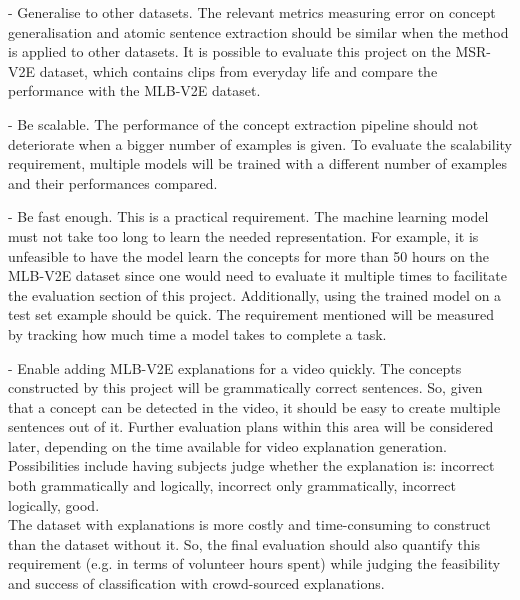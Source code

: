  - Generalise to other datasets. The relevant metrics measuring error on concept generalisation and atomic sentence extraction should be similar when the method is applied to other datasets. It is possible to evaluate this project on the MSR-V2E \cite{RefWorks:RefID:16-2021automatic} dataset, which contains clips from everyday life and compare the performance with the MLB-V2E \cite{RefWorks:RefID:16-2021automatic} dataset.
 
 - Be scalable. The performance of the concept extraction pipeline should not deteriorate when a bigger number of examples is given. To evaluate the scalability requirement, multiple models will be trained with a different number of examples and their performances compared.
 
 - Be fast enough. This is a practical requirement. The machine learning model must not take too long to learn the needed representation. For example, it is unfeasible to have the model learn the concepts for more than 50 hours on the MLB-V2E dataset since one would need to evaluate it multiple times to facilitate the evaluation section of this project. Additionally, using the trained model on a test set example should be quick. The requirement mentioned will be measured by tracking how much time a model takes to complete a task.
 
 - Enable adding MLB-V2E explanations for a video quickly. The concepts constructed by this project will be grammatically correct sentences. So, given that a concept can be detected in the video, it should be easy to create multiple sentences out of it. Further evaluation plans within this area will be considered later, depending on the time available for video explanation generation. Possibilities include having subjects judge whether the explanation is: incorrect both grammatically and logically, incorrect only grammatically, incorrect logically, good.\\
 
The dataset with explanations is more costly and time-consuming to construct than the dataset without it.
So, the final evaluation should also quantify this requirement (e.g. in terms of volunteer hours spent) while judging the feasibility and success of classification with crowd-sourced explanations.